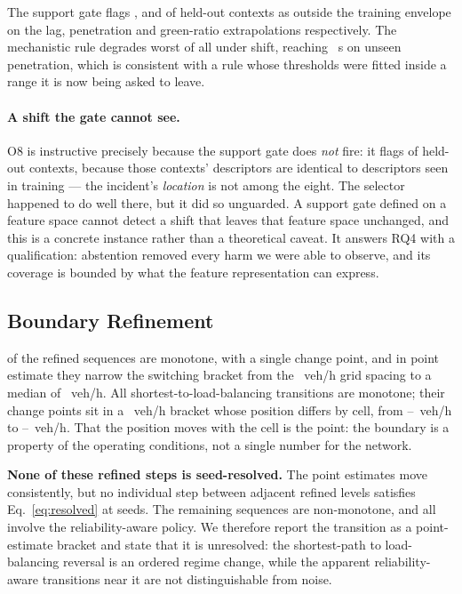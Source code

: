The support gate flags \NumOODFourLagSupport{}, \NumOODFivePenSupport{} and
\NumOODSixGreenSupport{} of held-out contexts as outside the training envelope
on the lag, penetration and green-ratio extrapolations respectively. The
mechanistic rule degrades worst of all under shift, reaching
\NumOODFivePenBOne~s on unseen penetration, which is consistent with a rule
whose thresholds were fitted inside a range it is now being asked to leave.

\paragraph{A shift the gate cannot see.} O8 is instructive precisely because the
support gate does \emph{not} fire: it flags \NumOODEightNorthSupport{} of
held-out contexts, because those contexts' descriptors are identical to
descriptors seen in training --- the incident's \emph{location} is not among the
eight. The selector happened to do well there, but it did so unguarded. A
support gate defined on a feature space cannot detect a shift that leaves that
feature space unchanged, and this is a concrete instance rather than a
theoretical caveat. It answers RQ4 with a qualification: abstention removed
every harm we were able to observe, and its coverage is bounded by what the
feature representation can express.

\subsection{Boundary Refinement}
\label{sec:boundary}

\NumBoundMono{} of the \NumBoundN{} refined sequences are monotone, with a
single change point, and in point estimate they narrow the switching bracket
from the \NumBoundGrid~veh/h grid spacing to a median of \NumBoundWidth~veh/h.
All \NumBoundPOneN{} shortest-to-load-balancing transitions are monotone; their
change points sit in a \NumBoundWidth~veh/h bracket whose position differs by
cell, from \NumBoundPOneEarliestLo--\NumBoundPOneEarliestHi~veh/h to
\NumBoundPOneLatestLo--\NumBoundPOneLatestHi~veh/h. That the position moves with
the cell is the point: the boundary is a property of the operating conditions,
not a single number for the network.

\textbf{None of these refined steps is seed-resolved.} The point estimates move
consistently, but no individual step between adjacent refined levels satisfies
Eq.~\ref{eq:resolved} at \NumSeeds{} seeds. The remaining \NumBoundNonMono{}
sequences are non-monotone, and all involve the reliability-aware policy. We
therefore report the transition as a point-estimate bracket and state that it is
unresolved: the shortest-path to load-balancing reversal is an ordered regime
change, while the apparent reliability-aware transitions near it are not
distinguishable from noise.

